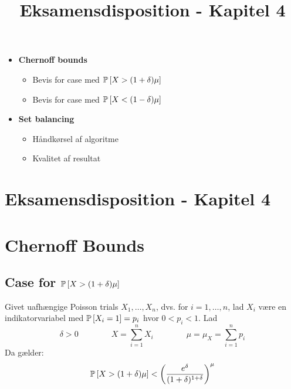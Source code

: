 
\title{Eksamensdisposition - Kapitel 4}


\maketitle

\begin{itemize}
\item \textbf{Chernoff bounds}
\begin{itemize}
  \item Bevis for case med $\P{X > (1 + \delta) \mu}$
  \item Bevis for case med $\P{X < (1 - \delta) \mu}$
\end{itemize}

\item \textbf{Set balancing}
\begin{itemize}
  \item Håndkørsel af algoritme
  \item Kvalitet af resultat
\end{itemize}
\end{itemize}


\newpage
\section{Eksamensdisposition - Kapitel 4}

\section{Chernoff Bounds}
\subsection{Case for $\P{X > (1 + \delta) \mu}$}
Givet uafhængige Poisson trials $X_1, \dots, X_n$, dvs. for $i = 1, \dots, n$, lad $X_i$ være en indikatorvariabel med $\P{X_i = 1} = p_i$ hvor $0 < p_i < 1$. Lad
$$
\delta > 0
\quad\quad\quad\quad
X = \sum_{i=1}^n X_i
\quad\quad\quad\quad
\mu = \mu_X = \sum_{i=1}^n p_i
$$
Da gælder:
\begin{align*}
  \P{X > (1+\delta) \mu} < \pfrac{e^\delta}{(1+\delta)^{1 + \delta}}^\mu
\end{align*}


